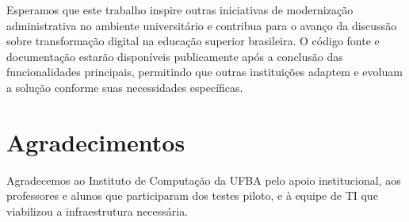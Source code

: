 \documentclass[portuguese]{sbc2025}%
\begin{document}
Esperamos que este trabalho inspire outras iniciativas de modernização administrativa no ambiente universitário e contribua para o avanço da discussão sobre transformação digital na educação superior brasileira. O código fonte e documentação estarão disponíveis publicamente após a conclusão das funcionalidades principais, permitindo que outras instituições adaptem e evoluam a solução conforme suas necessidades específicas.

\section*{Agradecimentos}

Agradecemos ao Instituto de Computação da UFBA pelo apoio institucional, aos professores e alunos que participaram dos testes piloto, e à equipe de TI que viabilizou a infraestrutura necessária.



\end{document}
